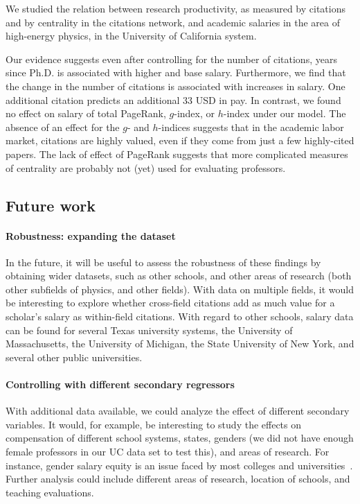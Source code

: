 We studied the relation between research productivity, as measured by citations and by centrality in the citations network, and academic salaries in the area of high-energy physics, in the University of California system.

Our evidence suggests even after controlling for the number of citations, years since Ph.D. is associated with higher and base salary. Furthermore, we find that the change in the number of citations is associated with increases in salary. One additional citation predicts an additional 33 USD in pay. In contrast, we found no effect on salary of total PageRank, $g$-index, or $h$-index under our model. The absence of an effect for the $g$- and $h$-indices suggests that in the academic labor market, citations are highly valued, even if they come from just a few highly-cited papers. The lack of effect of PageRank suggests that more complicated measures of centrality are probably not (yet) used for evaluating professors.

\subsection{Future work}
\paragraph{Robustness: expanding the dataset}
In the future, it will be useful to assess the robustness of these findings by obtaining wider datasets, such as other schools, and other areas of research (both other subfields of physics, and other fields). With data on multiple fields, it would be interesting to explore whether cross-field citations add as much value for a scholar’s salary as within-field citations. With regard to other schools, salary data can be found for several Texas university systems, the University of Massachusetts, the University of Michigan, the State University of New York, and several other public universities.

\paragraph{Controlling with different secondary regressors}
With additional data available, we could analyze the effect of different secondary variables. It would, for example, be interesting to study the effects on compensation of different school systems, states, genders (we did not have enough female professors in our UC data set to test this), and areas of research. For instance, gender salary equity is an issue faced by most colleges and universities~\cite{becker1995}. Further analysis could include different areas of research, location of schools, and teaching evaluations.

